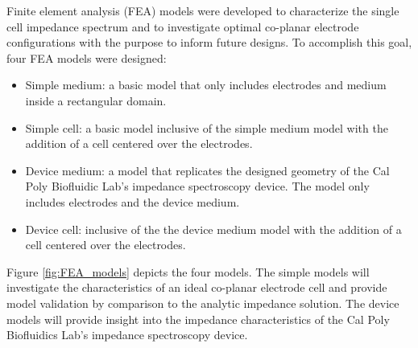 \par Finite element analysis (FEA) models were developed to characterize the single cell impedance spectrum and to investigate optimal co-planar electrode configurations with the purpose to inform future designs. To accomplish this goal, four FEA models were designed:

\begin{itemize}
    \item Simple medium: a basic model that only includes electrodes and medium inside a rectangular domain.
    \item Simple cell: a basic model inclusive of the simple medium model with the addition of a cell centered over the electrodes.
    \item Device medium: a model that replicates the designed geometry of the Cal Poly Biofluidic Lab's impedance spectroscopy device. The model only includes electrodes and the device medium.   
    \item Device cell: inclusive of the the device medium model with the addition of a cell centered over the electrodes. 
\end{itemize}

\par Figure \ref{fig:FEA_models} depicts the four models. The simple models will investigate the characteristics of an ideal co-planar electrode cell and provide model validation by comparison to the analytic impedance solution. The device models will provide insight into the impedance characteristics of the Cal Poly Biofluidics Lab's impedance spectroscopy device. 

